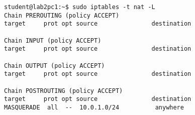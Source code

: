 \begin{lstlisting}
student@lab2pc1:~$ sudo iptables -t nat -L
Chain PREROUTING (policy ACCEPT)
target     prot opt source               destination         

Chain INPUT (policy ACCEPT)
target     prot opt source               destination         

Chain OUTPUT (policy ACCEPT)
target     prot opt source               destination         

Chain POSTROUTING (policy ACCEPT)
target     prot opt source               destination         
MASQUERADE  all  --  10.0.1.0/24          anywhere
\end{lstlisting}            
